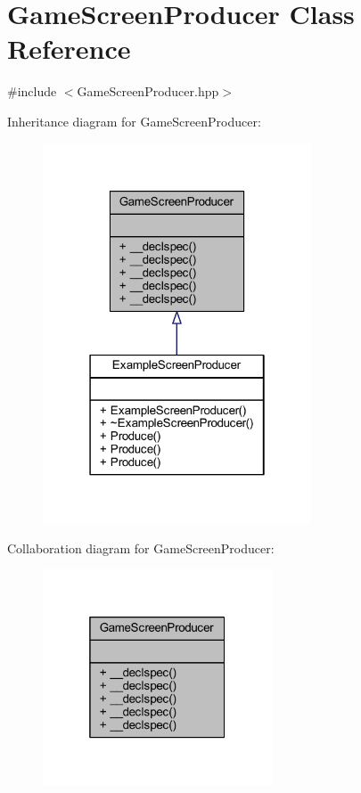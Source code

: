 \hypertarget{class_game_screen_producer}{\section{Game\-Screen\-Producer Class Reference}
\label{class_game_screen_producer}
}


{\ttfamily \#include $<$Game\-Screen\-Producer.\-hpp$>$}



Inheritance diagram for Game\-Screen\-Producer\-:\nopagebreak
\begin{figure}[H]
\begin{center}
\leavevmode
\includegraphics[width=226pt]{class_game_screen_producer__inherit__graph}
\end{center}
\end{figure}


Collaboration diagram for Game\-Screen\-Producer\-:\nopagebreak
\begin{figure}[H]
\begin{center}
\leavevmode
\includegraphics[width=193pt]{class_game_screen_producer__coll__graph}
\end{center}
\end{figure}
